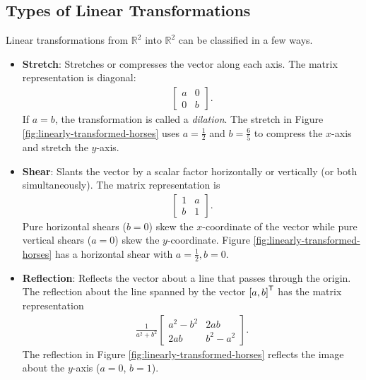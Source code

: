 \subsection*{Types of Linear Transformations} %

Linear transformations from $\mathbb{R}^2$ into $\mathbb{R}^2$ can be classified in a few ways.

\begin{itemize}

\item \textbf{Stretch}: %
Stretches or compresses the vector along each axis.
The matrix representation is diagonal:
%
\begin{align*}
\left[\begin{array}{rr}
a & 0  \\
0 & b
\end{array}\right].
\end{align*}
%
If $a=b$, the transformation is called a \emph{dilation}.
The stretch in Figure \ref{fig:linearly-transformed-horses} uses $a = \frac{1}{2}$ and $b = \frac{6}{5}$ to compress the $x$-axis and stretch the $y$-axis.

\item \textbf{Shear}: %
Slants the vector by a scalar factor horizontally or vertically (or both simultaneously).
The matrix representation is
%
\begin{align*}
\left[\begin{array}{cc}
1 & a\\
b & 1
\end{array}\right].
\end{align*}
%
Pure horizontal shears ($b = 0$) skew the $x$-coordinate of the vector while pure vertical shears ($a = 0$) skew the $y$-coordinate.
Figure \ref{fig:linearly-transformed-horses} has a horizontal shear with $a=\frac{1}{2},b=0$.

\item \textbf{Reflection}: Reflects the vector about a line that passes through the origin.
The reflection about the line spanned by the vector $\left[a, b\right]^{\mathsf T}$ has the matrix representation
%
\begin{align*}
\frac{1}{a^2 + b^2}
\left[\begin{array}{cc}
a^2 - b^2 & 2ab \\
2ab       & b^2 - a^2
\end{array}\right].
\end{align*}
%
The reflection in Figure \ref{fig:linearly-transformed-horses} reflects the image about the $y$-axis ($a=0$, $b=1$).


\end{itemize}
